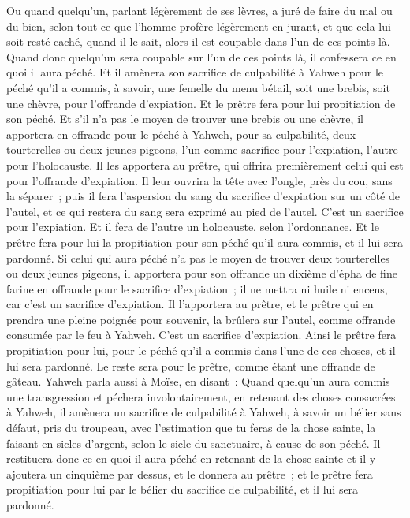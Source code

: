 \begin{multicols}{2}
Ou quand quelqu'un, parlant légèrement de ses lèvres, a juré de faire du mal ou du bien, selon tout ce que l'homme profère légèrement en jurant, et que cela lui soit resté caché, quand il le sait, alors il est coupable dans l'un de ces points-là.
Quand donc quelqu'un sera coupable sur l'un de ces points là, il confessera ce en quoi il aura péché.
Et il amènera son sacrifice de culpabilité à Yahweh pour le péché qu'il a commis, à savoir, une femelle du menu bétail, soit une brebis, soit une chèvre, pour l'offrande d'expiation. Et le prêtre fera pour lui propitiation de son péché.
Et s'il n'a pas le moyen de trouver une brebis ou une chèvre, il apportera en offrande pour le péché à Yahweh, pour sa culpabilité, deux tourterelles ou deux jeunes pigeons, l'un comme sacrifice pour l'expiation, l'autre pour l'holocauste.
Il les apportera au prêtre, qui offrira premièrement celui qui est pour l'offrande d'expiation. Il leur ouvrira la tête avec l'ongle, près du cou, sans la séparer~;
puis il fera l'aspersion du sang du sacrifice d'expiation sur un côté de l'autel, et ce qui restera du sang sera exprimé au pied de l'autel. C'est un sacrifice pour l'expiation.
Et il fera de l'autre un holocauste, selon l'ordonnance. Et le prêtre fera pour lui la propitiation pour son péché qu'il aura commis, et il lui sera pardonné.
Si celui qui aura péché n'a pas le moyen de trouver deux tourterelles ou deux jeunes pigeons, il apportera pour son offrande un dixième d'épha de fine farine en offrande pour le sacrifice d'expiation~; il ne mettra ni huile ni encens, car c'est un sacrifice d'expiation.
Il l'apportera au prêtre, et le prêtre qui en prendra une pleine poignée pour souvenir, la brûlera sur l'autel, comme offrande consumée par le feu à Yahweh. C'est un sacrifice d'expiation.
Ainsi le prêtre fera propitiation pour lui, pour le péché qu'il a commis dans l'une de ces choses, et il lui sera pardonné. Le reste sera pour le prêtre, comme étant une offrande de gâteau.
Yahweh parla aussi à Moïse, en disant~:
Quand quelqu'un aura commis une transgression et péchera involontairement, en retenant des choses consacrées à Yahweh, il amènera un sacrifice de culpabilité à Yahweh, à savoir un bélier sans défaut, pris du troupeau, avec l'estimation que tu feras de la chose sainte, la faisant en sicles d'argent, selon le sicle du sanctuaire, à cause de son péché.
Il restituera donc ce en quoi il aura péché en retenant de la chose sainte et il y ajoutera un cinquième par dessus, et le donnera au prêtre~; et le prêtre fera propitiation pour lui par le bélier du sacrifice de culpabilité, et il lui sera pardonné.

\end{multicols}
